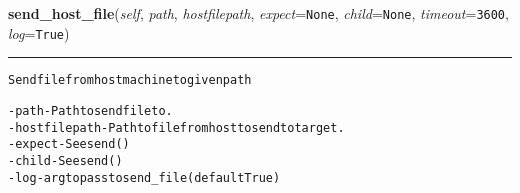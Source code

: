     \label{shutit_global:ShutIt:send_host_file}

    \vspace{0.5ex}

\hspace{.8\funcindent}\begin{boxedminipage}{\funcwidth}

    \raggedright \textbf{send\_host\_file}(\textit{self}, \textit{path}, \textit{hostfilepath}, \textit{expect}={\tt None}, \textit{child}={\tt None}, \textit{timeout}={\tt 3600}, \textit{log}={\tt True})

    \vspace{-1.5ex}

    \rule{\textwidth}{0.5\fboxrule}
\setlength{\parskip}{2ex}
\begin{alltt}
Send file from host machine to given path

- path         - Path to send file to.
- hostfilepath - Path to file from host to send to target.
- expect       - See send()
- child        - See send()
- log          - arg to pass to send\_file (default True)
\end{alltt}

\setlength{\parskip}{1ex}
    \end{boxedminipage}

    \label{shutit_global:ShutIt:send_host_dir}

    \vspace{0.5ex}

